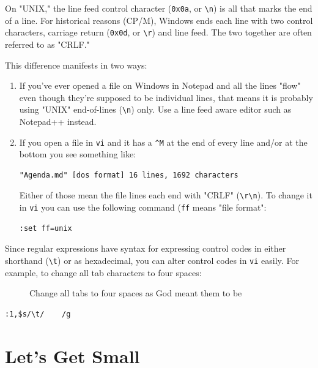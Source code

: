 \documentclass[10pt,]{book}
\numberwithin{figure}{chapter}
\DeclareRobustCommand{\drcap}[1]{\begin{figure}[H]\caption{#1}\end{figure}}
\DeclareRobustCommand{\drios}[1]{\index{OS and OS-Like Substances!#1}}
\begin{document}
On "UNIX," the line feed control character (\texttt{0x0a}, or
\texttt{\textbackslash{}n}) is all that marks the end of a line. For
historical reasons (CP/M\drios{CP/M}), Windows ends each line with two
control characters, carriage return (\texttt{0x0d}, or
\texttt{\textbackslash{}r}) and line feed. The two together are often
referred to as "CRLF."

This difference manifests in two ways:

\begin{enumerate}
\def\labelenumi{\arabic{enumi}.}
\item
  If you've ever opened a file on Windows in Notepad and all the lines
  "flow" even though they're supposed to be individual lines, that means
  it is probably using "UNIX" end-of-lines (\texttt{\textbackslash{}n})
  only. Use a line feed aware editor such as Notepad++ instead.
\item
  If you open a file in \texttt{vi} and it has a \texttt{\^{}M} at the
  end of every line and/or at the bottom you see something like:

\begin{verbatim}
"Agenda.md" [dos format] 16 lines, 1692 characters
\end{verbatim}

  Either of those mean the file lines each end with "CRLF"
  (\texttt{\textbackslash{}r\textbackslash{}n}). To change it in
  \texttt{vi} you can use the following command (\texttt{ff} means "file
  format":

\begin{verbatim}
:set ff=unix
\end{verbatim}
\end{enumerate}

Since regular expressions have syntax for expressing control codes in
either shorthand (\texttt{\textbackslash{}t}) or as hexadecimal, you can
alter control codes in \texttt{vi} easily. For example, to change all
tab characters to four spaces:

\drcap{Change all tabs to four spaces as God meant them to be}

\begin{verbatim}
:1,$s/\t/    /g
\end{verbatim}

\section*{Let's Get Small}\label{lets-get-small}
\end{document}
